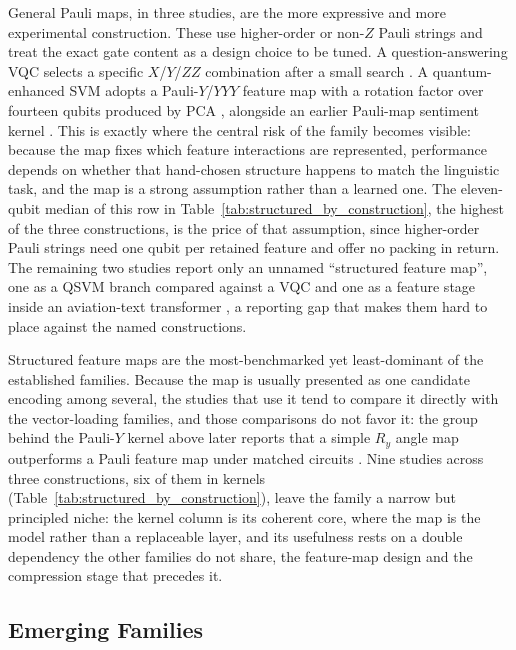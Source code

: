 \documentclass{ieeeaccess}
\begin{document}
General Pauli maps, in three studies, are the more expressive and more experimental construction. These use higher-order or non-$Z$ Pauli strings and treat the exact gate content as a design choice to be tuned. A question-answering VQC selects a specific $X$/$Y$/$ZZ$ combination after a small search \cite{katyayan_supervised_2023}. A quantum-enhanced SVM adopts a Pauli-$Y$/$YYY$ feature map with a rotation factor over fourteen qubits produced by PCA \cite{ruskanda_quantum-enhanced_2023}, alongside an earlier Pauli-map sentiment kernel \cite{mohammad_masum_hybrid_2023}. This is exactly where the central risk of the family becomes visible: because the map fixes which feature interactions are represented, performance depends on whether that hand-chosen structure happens to match the linguistic task, and the map is a strong assumption rather than a learned one. The eleven-qubit median of this row in Table~\ref{tab:structured_by_construction}, the highest of the three constructions, is the price of that assumption, since higher-order Pauli strings need one qubit per retained feature and offer no packing in return. The remaining two studies report only an unnamed ``structured feature map'', one as a QSVM branch compared against a VQC \cite{sunkavalli_experimentation_2024} and one as a feature stage inside an aviation-text transformer \cite{jagatheesan_quantum_2026}, a reporting gap that makes them hard to place against the named constructions.

Structured feature maps are the most-benchmarked yet least-dominant of the established families. Because the map is usually presented as one candidate encoding among several, the studies that use it tend to compare it directly with the vector-loading families, and those comparisons do not favor it: the group behind the Pauli-$Y$ kernel above later reports that a simple $R_y$ angle map outperforms a Pauli feature map under matched circuits \cite{ruskanda_evaluating_2025}. Nine studies across three constructions, six of them in kernels (Table~\ref{tab:structured_by_construction}), leave the family a narrow but principled niche: the kernel column is its coherent core, where the map is the model rather than a replaceable layer, and its usefulness rests on a double dependency the other families do not share, the feature-map design and the compression stage that precedes it.

\subsection{Emerging Families}
\label{subsec:emerging_specialized_interfaces}
\end{document}
